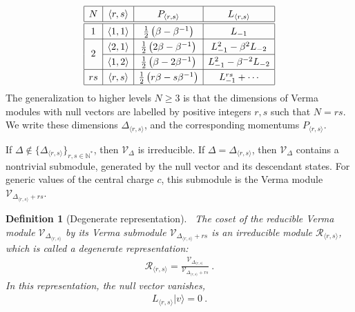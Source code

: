 \documentclass[12pt, a4paper]{article}
\theoremstyle{break}
\newtheorem{defn}[exo]{Definition}
\begin{document}
\begin{align}
\renewcommand{\arraystretch}{1.3}
\begin{array}{|c|c|c|c|}
\hline 
N & \langle r,s\rangle & P_{\langle r,s\rangle} &  L_{\langle r,s\rangle} 
\\
\hline\hline
1 & \langle 1,1\rangle & \frac12\left(\beta-\beta^{-1}\right) &  L_{-1}
\\
\hline
\multirow{2}{*}{2} & 
\langle 2,1\rangle & \frac12\left( 2\beta- \beta^{-1}\right)  & L_{-1}^2 - \beta^2 L_{-2}
\\
\cline{2-4}
& \langle 1,2\rangle & \frac12\left( \beta- 2\beta^{-1} \right) & L_{-1}^2 - \beta^{-2} L_{-2} 
\\
\hline
rs & \langle r,s\rangle &  \frac12\left(r\beta-s\beta^{-1}\right) & L_{-1}^{rs} + \cdots 
\\
\hline
\end{array}
\label{eq:ars}
\end{align}
The generalization to higher levels $N\geq 3$ is that the dimensions of Verma modules with null vectors are labelled by positive integers $r,s$ such that $N=rs$. We write these dimensions $\Delta_{\langle r,s\rangle}$, and the corresponding momentums $P_{\langle r,s\rangle}$. 

If $\Delta\notin\{\Delta_{\langle r,s\rangle}\}_{r,s\in\mathbb{N}^*}$, then $\mathcal V_\Delta$ is irreducible. If $\Delta = \Delta_{\langle r,s\rangle}$, then $\mathcal V_\Delta$ contains a nontrivial submodule, generated by the null vector and its descendant states. For generic values of the central charge $c$, this submodule is the Verma module $\mathcal V_{\Delta_{\langle r,s\rangle}+rs}$.

\begin{defn}[Degenerate representation]
 ~\label{def:deg}
The coset of the reducible Verma module $\mathcal V_{\Delta_{\langle r,s\rangle}}$ by its Verma submodule $\mathcal V_{\Delta_{\langle r,s\rangle}+rs}$ is an irreducible module $\mathcal{R}_{\langle r,s\rangle}$, which is called a degenerate representation:
\begin{align}
 \mathcal{R}_{\langle r,s\rangle} = \frac{\mathcal V_{\Delta_{\langle r,s\rangle}}}{\mathcal V_{\Delta_{\langle r,s\rangle}+rs}}\ .
\end{align}
In this representation, the null vector vanishes,
\begin{align}
 L_{\langle r,s\rangle}|v\rangle = 0\ .
\end{align}
\end{defn}
\end{document}
